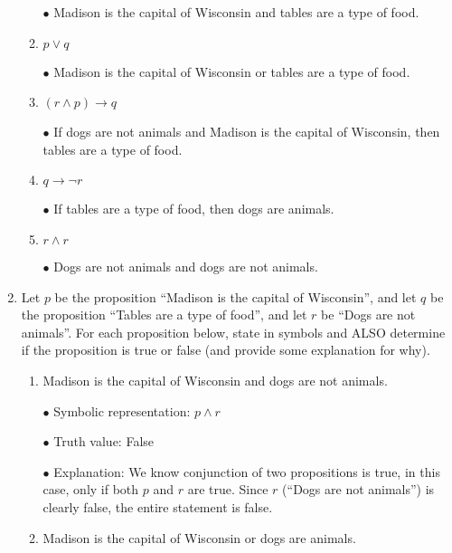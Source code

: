 \documentclass{article}
\begin{document}
\begin{enumerate}
\begin{enumerate}
                        $\bullet$ Madison is the capital of Wisconsin and tables are a type of food.

                  \item $p \vee q$

                        $\bullet$ Madison is the capital of Wisconsin or tables are a type of food.

                  \item $(r \wedge p) \rightarrow q$

                        $\bullet$ If dogs are not animals and Madison is the capital of Wisconsin, then tables are a type of food.

                  \item $q \rightarrow \neg r$

                        $\bullet$ If tables are a type of food, then dogs are animals.

                  \item $r \wedge r$

                        $\bullet$ Dogs are not animals and dogs are not animals.

            \end{enumerate}

            \newpage

      \item
            Let $p$ be the proposition ``Madison is the capital of Wisconsin'', and let $q$ be the proposition ``Tables are a type of food'', and let $r$ be ``Dogs are not animals''. For each proposition below, state in symbols and ALSO determine if the proposition is true or false (and provide some explanation for why).
            \begin{enumerate}
                  \item Madison is the capital of Wisconsin and dogs are not animals.

                        $\bullet$ Symbolic representation: $p \wedge r$

                        $\bullet$ Truth value: False

                        $\bullet$ Explanation: We know conjunction of two propositions is true, in this case, only if both $p$ and $r$ are true. Since $r$ (``Dogs are not animals'') is clearly false, the entire statement is false.

                  \item Madison is the capital of Wisconsin or dogs are animals.


\end{enumerate}
\end{enumerate}
\end{document}
